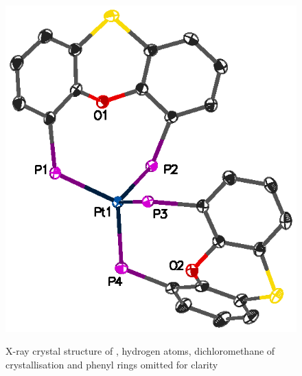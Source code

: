 \begin{figure}[htbp]
\begin{center}
\vspace{0.5cm}
\includegraphics[scale=0.97]{../Figures/CrystalPtSPh2phenyl.eps}
\caption[X-ray crystal structure of \ce{[Pt(Ph-thixantphos)2]}]{X-ray crystal structure of \ce{[Pt(Ph-thixantphos)2]}, hydrogen atoms, dichloromethane of crystallisation and phenyl rings omitted for clarity}
\vspace{0.2cm}
\label{crystalbisthixantphosplatinumphenyl}
\end{center}
\end{figure}
\vspace{0.2cm}


